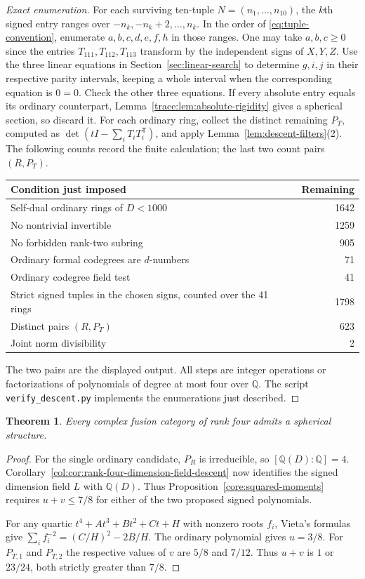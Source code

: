 \documentclass[11pt,a4paper]{article}
\newtheorem{theorem}{Theorem}[section]
\theoremstyle{definition}\newtheorem{definition}[theorem]{Definition}
\theoremstyle{remark}\newtheorem{remark}[theorem]{Remark}
\newcommand{\Q}{\mathbb Q}
\numberwithin{equation}{section}
\begin{document}
\begin{proof}[Exact enumeration]
For each surviving ten-tuple $N=(n_1,\ldots,n_{10})$, the $k$th signed
entry ranges over $-n_k,-n_k+2,\ldots,n_k$. In the order of
\eqref{eq:tuple-convention}, enumerate $a,b,c,d,e,f,h$ in those ranges.
One may take $a,b,c\ge0$ since the entries $T_{111},T_{112},T_{113}$
transform by the independent signs of $X,Y,Z$. Use the three linear
equations in Section~\ref{sec:linear-search} to determine $g,i,j$
in their respective parity intervals, keeping a whole interval when
the corresponding equation is $0=0$. Check the other three equations.
If every absolute entry
equals its ordinary counterpart, Lemma~\ref{trace:lem:absolute-rigidity}
gives a spherical section, so discard it. For each ordinary ring, collect
the distinct remaining $P_T$, computed as
$\det(tI-\sum_i T_iT_i^{\mathsf T})$, and apply
Lemma~\ref{lem:descent-filters}(2). The following counts record the
finite calculation; the last two count pairs $(R,P_T)$.
\begin{center}\small
\begin{tabular}{@{}lr@{}}\toprule
Condition just imposed & Remaining \\ \midrule
Self-dual ordinary rings of $D<1000$ & 1642\\
No nontrivial invertible & 1259\\
No forbidden rank-two subring & 905\\
Ordinary formal codegrees are $d$-numbers & 71\\
Ordinary codegree field test & 41\\ \midrule
Strict signed tuples in the chosen signs, counted over the 41 rings & 1798\\
Distinct pairs $(R,P_T)$ & 623\\
Joint norm divisibility & 2\\ \bottomrule
\end{tabular}
\end{center}
The two pairs are the displayed output. All steps are integer operations or
factorizations of polynomials of degree at most four over $\Q$. The script
\texttt{verify\_descent.py} implements the enumerations just described.
\end{proof}

\begin{theorem}\label{thm:universal-spherical}
Every complex fusion category of rank four admits a spherical structure.
\end{theorem}
\begin{proof}
For the single ordinary candidate, $P_R$ is irreducible, so $[\Q(D):\Q]=4$.
Corollary~\ref{col:cor:rank-four-dimension-field-descent} now identifies the
signed dimension field $L$ with $\Q(D)$. Thus
Proposition~\ref{core:squared-moments} requires $u+v\le7/8$ for either
of the two proposed signed polynomials.

For any quartic $t^4+At^3+Bt^2+Ct+H$ with nonzero roots $f_i$,
Vieta's formulas give $\sum_i f_i^{-2}=(C/H)^2-2B/H$.
The ordinary polynomial gives $u=3/8$. For $P_{T,1}$ and $P_{T,2}$
the respective values of $v$ are $5/8$ and $7/12$. Thus $u+v$ is
$1$ or $23/24$, both strictly greater than $7/8$.
\end{proof}
\end{document}
